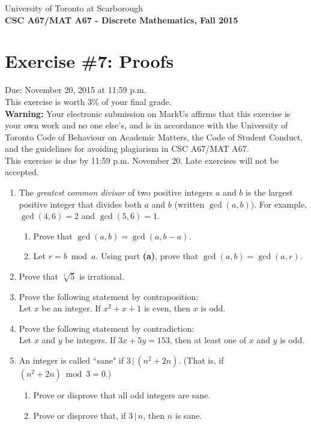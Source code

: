 \documentclass{article}
\begin{document}
{\large \noindent{}University of Toronto at Scarborough\\
\textbf{CSC A67/MAT A67 - Discrete Mathematics, Fall 2015}}

\section*{\huge Exercise \#7: Proofs}

{\large Due: November 20, 2015 at 11:59 p.m.\\
This exercise is worth 3\% of your final grade.}\\[1em]
\textbf{Warning:} Your electronic submission on MarkUs affirms that this exercise is your own work and no
one else's, and is in accordance with the University of Toronto Code of Behaviour on Academic Matters,
the Code of Student Conduct, and the guidelines for avoiding plagiarism in CSC A67/MAT A67.\\[1ex]
This exercise is due by 11:59 p.m. November 20. Late exercises will not be accepted.\\[1ex]
\renewcommand{\labelenumi}{\arabic{enumi}.}
\renewcommand{\labelenumii}{(\alph{enumii})}
\begin{enumerate}
\item The\marginpar{[5]} \textit{greatest common divisor} of two positive integers $a$ and $b$ is the largest positive integer that divides both $a$ and $b$ (written $\gcd(a,b)$). For example, $\gcd(4,6)=2$ and $\gcd(5,6)=1$.
	\begin{enumerate}
	\item Prove that $\gcd(a,b) = \gcd(a,b-a).$
	\item Let $r=b\bmod a$. Using part \textbf{(a)}, prove that $\gcd(a,b) = \gcd(a,r)$.
	\end{enumerate}
\item Prove\marginpar{[4]} that $\sqrt[3]{5}$ is irrational.
\item Prove\marginpar{[4]} the following statement by contraposition:\\[1ex]
Let $x$ be an integer. If $x^2+x+1$ is even, then $x$ is odd.
\item Prove\marginpar{[4]} the following statement by contradiction:\\[1ex]
Let $x$ and $y$ be integers. If $3x+5y=153$, then at least one of $x$ and $y$ is odd.
\item An\marginpar{[4]} integer is called ``sane" if $3\,|\,(n^2+2n)$. (That is, if $(n^2+2n)\bmod 3=0$.)
	\begin{enumerate}
	\item Prove or disprove that all odd integers are sane.
	\item Prove or disprove that, if $3\,|\,n$, then $n$ is sane.
	\end{enumerate}
\end{enumerate}
\hrulefill\\
\label{end}
\end{document}
